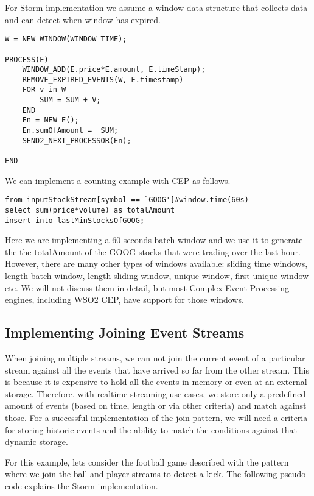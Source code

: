 \documentclass{sig-alternate}
\begin{document}
{For Storm implementation we assume a window data structure that collects data and can detect when window has expired. 

\begin{lstlisting}[mathescape, showstringspaces=false]
W = NEW WINDOW(WINDOW_TIME); 

PROCESS(E) 
	WINDOW_ADD(E.price*E.amount, E.timeStamp); 
	REMOVE_EXPIRED_EVENTS(W, E.timestamp)
	FOR v in W
		SUM = SUM + V; 
	END
	En = NEW_E(); 
	En.sumOfAmount =  SUM; 
	SEND2_NEXT_PROCESSOR(En); 
	
END
\end{lstlisting}


We can implement a counting example with CEP as follows.

\begin{lstlisting}[mathescape, showstringspaces=false]
from inputStockStream[symbol == `GOOG']#window.time(60s)
select sum(price*volume) as totalAmount
insert into lastMinStocksOfGOOG; 
\end{lstlisting}


Here we are implementing a 60 seconds batch window and we use it to generate the the totalAmount of the GOOG stocks that were trading over the last hour. However, there are many other types of windows available:  sliding time windows, length batch window, length sliding window, unique window, first unique window etc.  We will not discuss them in detail, but most Complex Event Processing engines, including WSO2 CEP, have support for those windows. 

\subsection{Implementing Joining Event Streams}
When joining multiple streams, we can not join the current event of a particular stream against all the events that have arrived so far from the other stream. This is because it is expensive to hold all the events in memory or even at an external storage. Therefore, with realtime streaming use cases, we store only a predefined amount of events (based on time, length or via other criteria) and match against those. For a successful implementation of the join pattern, we will need a criteria for storing historic events and the ability to match the conditions against that dynamic storage. 

For this example, lets consider the football game described with the pattern where we join the ball and player streams to detect a kick. The following pseudo code explains the Storm implementation. 

}
\end{document}

